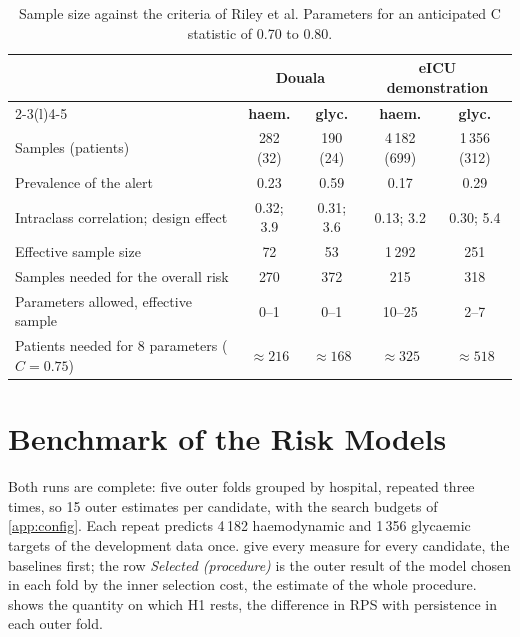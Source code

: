 \begin{table}[htbp]
\centering\footnotesize
\caption{Sample size against the criteria of Riley et al. Parameters for an anticipated C statistic of 0.70 to 0.80.}\label{tab:sample-size}
\begin{tabularx}{\textwidth}{@{}X cccc@{}}
\toprule
 & \multicolumn{2}{c}{\textbf{Douala}} & \multicolumn{2}{c}{\textbf{eICU demonstration}} \\
\cmidrule(lr){2-3}\cmidrule(l){4-5}
 & \textbf{haem.} & \textbf{glyc.} & \textbf{haem.} & \textbf{glyc.} \\
\midrule
Samples (patients) & 282 (32) & 190 (24) & 4\,182 (699) & 1\,356 (312) \\
Prevalence of the alert & 0.23 & 0.59 & 0.17 & 0.29 \\
Intraclass correlation; design effect & 0.32; 3.9 & 0.31; 3.6 & 0.13; 3.2 & 0.30; 5.4 \\
Effective sample size & 72 & 53 & 1\,292 & 251 \\
Samples needed for the overall risk & 270 & 372 & 215 & 318 \\
Parameters allowed, effective sample & 0--1 & 0--1 & 10--25 & 2--7 \\
Patients needed for 8 parameters ($C = 0.75$) & $\approx 216$ & $\approx 168$ & $\approx 325$ & $\approx 518$ \\
\bottomrule
\end{tabularx}
\end{table}

\section{Benchmark of the Risk Models}\label{sec:results-benchmark}

Both runs are complete: five outer folds grouped by hospital, repeated three times, so 15 outer estimates per candidate, with the search budgets of \cref{app:config}. Each repeat predicts 4\,182 haemodynamic and 1\,356 glycaemic targets of the development data once.  give every measure for every candidate, the baselines first; the row \emph{Selected (procedure)} is the outer result of the model chosen in each fold by the inner selection cost, the estimate of the whole procedure.  shows the quantity on which H1 rests, the difference in RPS with persistence in each outer fold.

